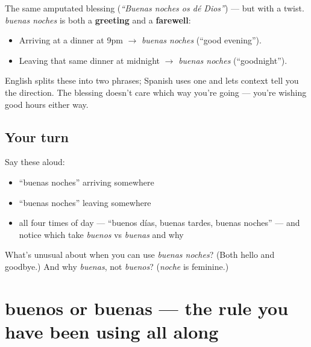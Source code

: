 \begin{culture}
The same amputated blessing (\emph{\textquotedblleft{}Buenas noches os dé Dios\textquotedblright{}}) — but with a twist. \emph{buenas noches} is both a \textbf{greeting} and a \textbf{farewell}:

\begin{itemize}
\raggedright
  \item Arriving at a dinner at 9pm $\to$ \emph{buenas noches} (\textquotedblleft{}good evening\textquotedblright{}).
  \item Leaving that same dinner at midnight $\to$ \emph{buenas noches} (\textquotedblleft{}goodnight\textquotedblright{}).
\end{itemize}

English splits these into two phrases; Spanish uses one and lets context tell you the direction. The blessing doesn't care which way you're going — you're wishing good hours either way.
\end{culture}

\subsection*{Your turn}
Say these aloud:

\begin{itemize}
\raggedright
  \item \textquotedblleft{}buenas noches\textquotedblright{} arriving somewhere
  \item \textquotedblleft{}buenas noches\textquotedblright{} leaving somewhere
  \item all four times of day — \textquotedblleft{}buenos días, buenas tardes, buenas noches\textquotedblright{} — and notice which take \emph{buenos} vs \emph{buenas} and why
\end{itemize}

\begin{tcolorbox}[breakable,colback=teal!4,colframe=teal!35!black,title={Before you move on}]
What's unusual about when you can use \emph{buenas noches}? (Both hello and goodbye.) And why \emph{buenas}, not \emph{buenos}? (\emph{noche} is feminine.)
\end{tcolorbox}
\section[buenos / buenas]{buenos or buenas — the rule you have been using all along}

\label{lesson:ES-C02-concordancia}



